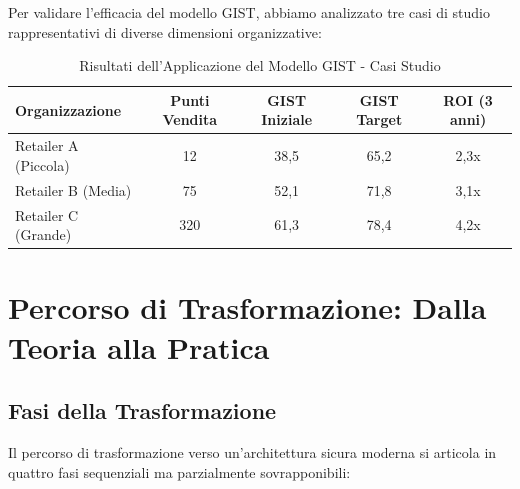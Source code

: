 Per validare l'efficacia del modello GIST, abbiamo analizzato tre casi di studio rappresentativi di diverse dimensioni organizzative:

\begin{table}[h!]
\centering
\caption{Risultati dell'Applicazione del Modello GIST - Casi Studio}
\label{tab:gist_case_studies}
\begin{tabular}{|l|c|c|c|c|}
\hline
\textbf{Organizzazione} & \textbf{Punti Vendita} & \textbf{GIST Iniziale} & \textbf{GIST Target} & \textbf{ROI (3 anni)} \\
\hline
Retailer A (Piccola) & 12 & 38,5 & 65,2 & 2,3x \\
Retailer B (Media) & 75 & 52,1 & 71,8 & 3,1x \\
Retailer C (Grande) & 320 & 61,3 & 78,4 & 4,2x \\
\hline
\end{tabular}
\end{table}

\section{\texorpdfstring{Percorso di Trasformazione: Dalla Teoria alla Pratica}{5.4 - Percorso di Trasformazione: Dalla Teoria alla Pratica}}
\label{sec:5.4}

\subsection{\texorpdfstring{Fasi della Trasformazione}{5.4.1 - Fasi della Trasformazione}}
\label{subsec:5.4.1}

Il percorso di trasformazione verso un'architettura sicura moderna si articola in quattro fasi sequenziali ma parzialmente sovrapponibili:

